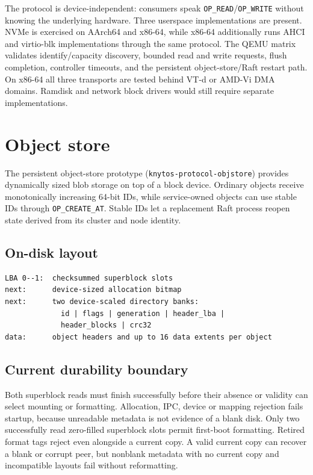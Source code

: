 The protocol is device-independent: consumers speak
\texttt{OP\_READ}/\texttt{OP\_WRITE} without knowing the underlying hardware.
Three userspace implementations are present. NVMe is exercised on AArch64 and
x86-64, while x86-64 additionally runs AHCI and virtio-blk implementations through
the same protocol. The QEMU matrix validates identify/capacity discovery,
bounded read and write requests, flush completion, controller timeouts, and
the persistent object-store/Raft restart path. On x86-64 all three transports
are tested behind VT-d or AMD-Vi DMA domains. Ramdisk and network block drivers
would still require separate implementations.

\section{Object store}

The persistent object-store prototype (\texttt{knytos-protocol-objstore})
provides dynamically sized blob storage on top of a block device. Ordinary objects
receive monotonically increasing 64-bit IDs, while service-owned objects can use
stable IDs through \texttt{OP\_CREATE\_AT}. Stable IDs let a replacement Raft
process reopen state derived from its cluster and node identity.

\subsection{On-disk layout}

\begin{verbatim}
LBA 0--1:  checksummed superblock slots
next:      device-sized allocation bitmap
next:      two device-scaled directory banks:
             id | flags | generation | header_lba |
             header_blocks | crc32
data:      object headers and up to 16 data extents per object
\end{verbatim}

\subsection{Current durability boundary}

Both superblock reads must finish successfully before their absence or
validity can select mounting or formatting. Allocation, IPC, device or mapping
rejection fails startup, because unreadable metadata is not evidence of a blank disk.
Only two successfully read zero-filled superblock slots permit first-boot
formatting. Retired format tags reject even alongside a current copy. A valid
current copy can recover a blank or corrupt peer, but nonblank metadata with no
current copy and incompatible layouts fail without reformatting.

